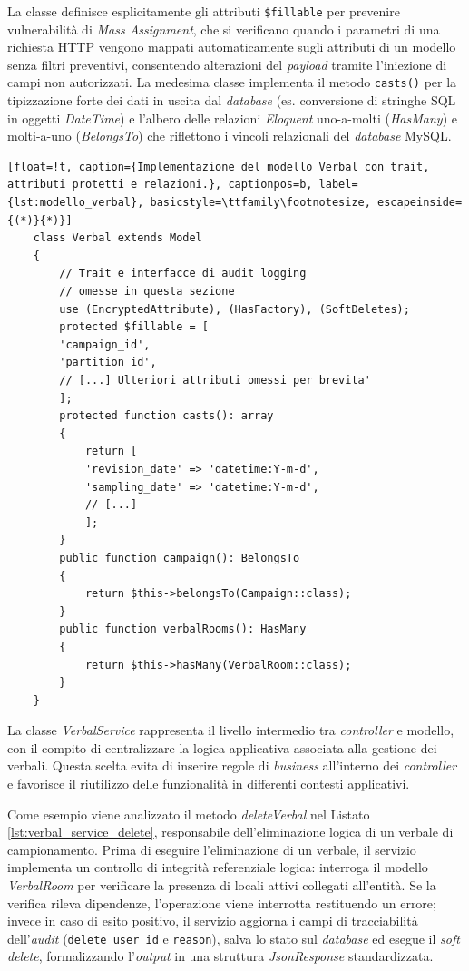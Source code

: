 La classe definisce esplicitamente gli attributi \texttt{\$fillable} per prevenire vulnerabilità di \textit{Mass Assignment}, che si verificano quando i parametri di una richiesta HTTP vengono mappati automaticamente sugli attributi di un modello senza filtri preventivi, consentendo alterazioni del \textit{payload} tramite l'iniezione di campi non autorizzati. La medesima classe implementa il metodo \texttt{casts()} per la tipizzazione forte dei dati in uscita dal \textit{database} (es. conversione di stringhe SQL in oggetti \textit{DateTime}) e l'albero delle relazioni \textit{Eloquent} uno-a-molti (\textit{HasMany}) e molti-a-uno (\textit{BelongsTo}) che riflettono i vincoli relazionali del \textit{database} MySQL.
\begin{lstlisting}[float=!t, caption={Implementazione del modello Verbal con trait, attributi protetti e relazioni.}, captionpos=b, label={lst:modello_verbal}, basicstyle=\ttfamily\footnotesize, escapeinside={(*)}{*)}]
	class Verbal extends Model
	{
		// Trait e interfacce di audit logging 
		// omesse in questa sezione
		use (EncryptedAttribute), (HasFactory), (SoftDeletes);
		protected $fillable = [
		'campaign_id',
		'partition_id',
		// [...] Ulteriori attributi omessi per brevita'
		];
		protected function casts(): array
		{
			return [
			'revision_date' => 'datetime:Y-m-d',
			'sampling_date' => 'datetime:Y-m-d',
			// [...]
			];
		}
		public function campaign(): BelongsTo
		{
			return $this->belongsTo(Campaign::class);
		}
		public function verbalRooms(): HasMany
		{
			return $this->hasMany(VerbalRoom::class);
		}
	}
\end{lstlisting}
La classe \textit{VerbalService} rappresenta il livello intermedio tra \textit{controller} e modello, con il compito di centralizzare la logica applicativa associata alla gestione dei verbali. Questa scelta evita di inserire regole di \textit{business} all'interno dei \textit{controller} e favorisce il riutilizzo delle funzionalità in differenti contesti applicativi.

Come esempio viene analizzato il metodo \textit{deleteVerbal} nel Listato \ref{lst:verbal_service_delete}, responsabile dell'eliminazione logica di un verbale di campionamento. Prima di eseguire l'eliminazione di un verbale, il servizio implementa un controllo di integrità referenziale logica: interroga il modello \textit{VerbalRoom} per verificare la presenza di locali attivi collegati all'entità. Se la verifica rileva dipendenze, l'operazione viene interrotta restituendo un errore; invece in caso di esito positivo, il servizio aggiorna i campi di tracciabilità dell'\textit{audit} (\texttt{delete\_user\_id} e \texttt{reason}), salva lo stato sul \textit{database} ed esegue il \textit{soft delete}, formalizzando l'\textit{output} in una struttura \textit{JsonResponse} standardizzata.

